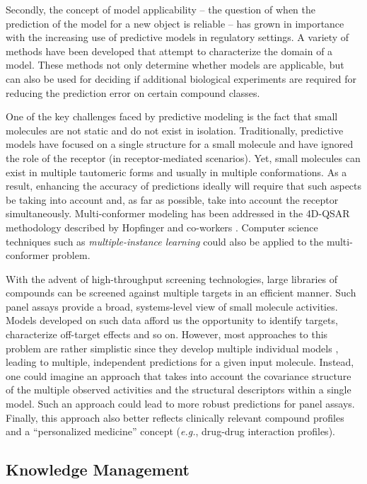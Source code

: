\documentclass{sig-alternate}
\begin{document}
Secondly, the concept of model applicability -- the question of when
the prediction of the model for a new object is reliable -- has grown
in importance with the increasing use of predictive models in
regulatory settings. A variety of methods have been developed that
attempt to characterize the domain of a model. These methods not only
determine whether models are applicable, but can also be used for
deciding if additional biological experiments are required for
reducing the prediction error on certain compound classes.

One of the key challenges faced by predictive modeling is the fact
that small molecules are not static and do not exist in
isolation. Traditionally, predictive models have focused on a single
structure for a small molecule and have ignored the role of the
receptor (in receptor-mediated scenarios). Yet, small molecules can
exist in multiple tautomeric forms and usually in multiple
conformations. As a result, enhancing the accuracy of predictions
ideally will require that such aspects be taking into account and, as
far as possible, take into account the receptor
simultaneously. Multi-conformer modeling has been addressed in the
4D-QSAR methodology described by Hopfinger and co-workers
\cite{Albuquerque:1998ys}.  Computer science techniques such as
\emph{multiple-instance learning} could also be applied to the
multi-conformer problem.

With the advent of high-throughput screening technologies, large
libraries of compounds can be screened against multiple targets in an
efficient manner. Such panel assays provide a broad, systems-level
view of small molecule activities.  Models developed on such data
afford us the opportunity to identify targets, characterize off-target
effects and so on. However, most approaches to this problem are rather
simplistic since they develop multiple individual models
\cite{Chen:2010zr}, leading to multiple, independent predictions for a
given input molecule.  Instead, one could imagine an approach that
takes into account the covariance structure of the multiple observed
activities and the structural descriptors within a single model. Such
an approach could lead to more robust predictions for panel
assays. Finally, this approach also better reflects clinically
relevant compound profiles~\cite{kuhn2010} and a ``personalized
medicine'' concept (\emph{e.g.}, drug-drug interaction profiles).

\subsection{Knowledge Management}
\label{sec:knowledge-management}
\end{document}

